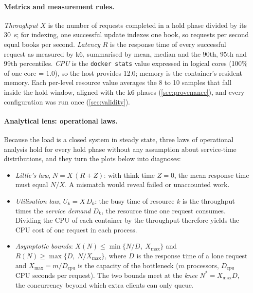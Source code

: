 \documentclass[10pt,a4paper]{article}
\newcommand{\code}[1]{\texttt{#1}}
\begin{document}
\paragraph{Metrics and measurement rules.}
\emph{Throughput} $X$ is the number of requests completed in a hold phase divided
by its 30~s; for indexing, one successful update indexes one book, so
requests per second equal books per second. \emph{Latency} $R$ is the response
time of every successful request as measured by k6, summarised by mean,
median and the 90th, 95th and 99th percentiles. \emph{CPU} is the
\code{docker stats} value expressed in logical cores (100\% of one core =
1.0), so the host provides 12.0; memory is the container's resident memory.
Each per-level resource value averages the 8 to 10 samples that fall inside the
hold window, aligned with the k6 phases (\cref{sec:provenance}), and every
configuration was run once (\cref{sec:validity}).

\paragraph{Analytical lens: operational laws.}
Because the load is a closed system in steady state, three laws of operational
analysis hold for every hold phase without any assumption about service-time
distributions, and they turn the plots below into diagnoses:
\begin{itemize}
  \item \emph{Little's law}, $N = X\,(R + Z)$: with think time $Z = 0$, the mean
  response time must equal $N/X$. A mismatch would reveal failed or
  unaccounted work.
  \item \emph{Utilisation law}, $U_k = X\,D_k$: the busy time of resource $k$
  is the throughput times the \emph{service demand} $D_k$, the resource time one
  request consumes. Dividing the CPU of each container by the throughput
  therefore yields the CPU cost of one request in each process.
  \item \emph{Asymptotic bounds}: $X(N) \le \min\{N/D,\; X_{\max}\}$ and
  $R(N) \ge \max\{D,\; N/X_{\max}\}$, where $D$ is the response time of a lone
  request and $X_{\max} = m / D_{\text{cpu}}$ is the capacity of the bottleneck
  ($m$ processors, $D_{\text{cpu}}$ CPU seconds per request). The two bounds meet at
  the \emph{knee} $N^{*} = X_{\max} D$, the concurrency beyond which extra
  clients can only queue.
\end{itemize}

\end{document}
